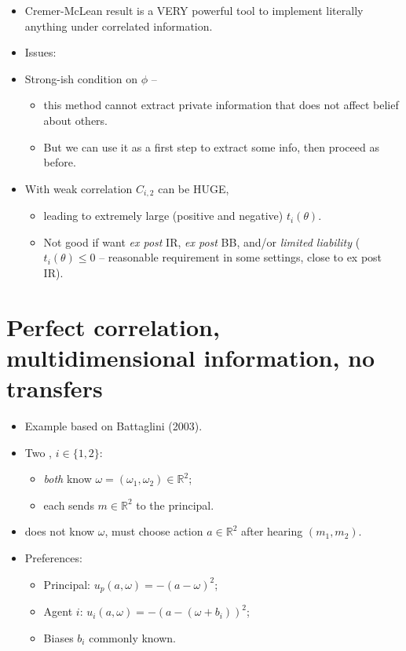 \documentclass[english,handout,10pt]{beamer}		%
\def\lyxframeend{} %
\begin{document}
\begin{itemize}
	\item Cremer-McLean result is a VERY powerful tool to implement literally anything under correlated information.
	\item Issues:
	\item Strong-ish condition on $\phi$ --
	\begin{itemize}
		\item this method cannot extract private information that does not affect belief about others.
		\item But we can use it as a first step to extract some info, then proceed as before.
	\end{itemize}
	\item With weak correlation $C_{i,2}$ can be HUGE,
	\begin{itemize}
		\item leading to extremely large (positive and negative) $t_i(\theta)$.
		\item Not good if want \emph{ex post} IR, \emph{ex post} BB, and/or \emph{limited liability} ($t_i(\theta)\leq 0$ -- reasonable requirement in some settings, close to ex post IR).
	\end{itemize}
\end{itemize}
\lyxframeend


\section{Perfect correlation, multidimensional information, no transfers}

\begin{itemize}
	\item Example based on Battaglini (2003).
	\item Two , $i \in \{1,2\}$:
	\begin{itemize}
		\item \emph{both} know  $\omega = (\omega_1,\omega_2) \in \mathbb{R}^2$;
		\item each sends  $m \in \mathbb{R}^2$ to the principal.
	\end{itemize}
	\item {} does not know $\omega$, must choose action $a \in \mathbb{R}^2$ after hearing $(m_1,m_2)$.
	\item Preferences:
	\begin{itemize}
		\item Principal: $u_p (a,\omega) = -(a-\omega)^2$;
		\item Agent $i$: $u_i (a,\omega) = -(a-(\omega+b_i))^2$;
		\item Biases $b_i$ commonly known.
	\end{itemize}
\end{itemize}
\lyxframeend
\end{document}
